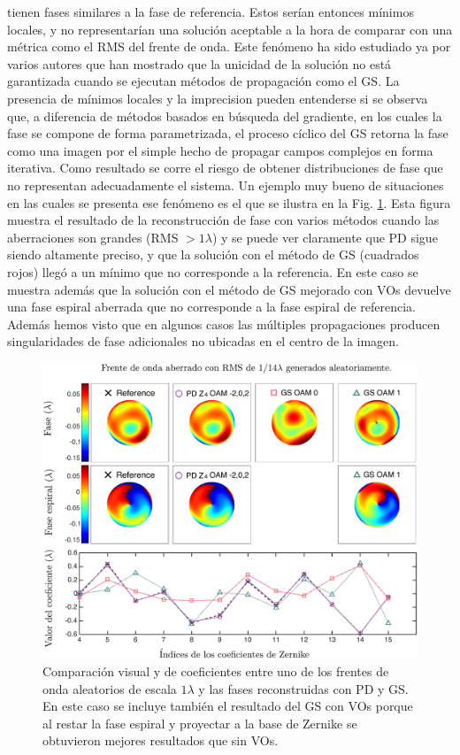 tienen fases similares a la fase de referencia.  Estos serían entonces
mínimos locales, y no representarían una solución aceptable a la hora
de comparar con una métrica como el RMS del frente de onda. Este
fenómeno ha sido estudiado ya por varios autores
 que han mostrado que la unicidad
de la solución no está garantizada cuando se ejecutan métodos de
propagación como el GS.  
La presencia de mínimos locales y la
imprecision pueden entenderse si se observa 
que, a diferencia de métodos basados en búsqueda del gradiente, en los
cuales la fase se compone de forma parametrizada, el proceso cíclico
del GS retorna la fase como una imagen por el simple hecho de propagar campos complejos
en forma iterativa. Como resultado se corre el riesgo de obtener distribuciones
de fase que no representan adecuadamente el sistema.  Un ejemplo muy bueno de situaciones en las
cuales se presenta ese fenómeno es el que se ilustra en la Fig.
\ref{fig:visual_comparison}. Esta figura muestra el resultado de la
reconstrucción de fase con varios métodos cuando las aberraciones son
grandes (RMS $>1\lambda$) y se puede ver claramente que PD sigue siendo
altamente preciso, y que la solución
con el método de GS (cuadrados rojos) llegó a un mínimo que no
corresponde a la referencia. En este caso se muestra además que la
solución con el método de GS mejorado con VOs devuelve una fase espiral
aberrada que no corresponde a la fase espiral de referencia. Además hemos
visto que en algunos casos las múltiples propagaciones
producen singularidades de fase adicionales no ubicadas en el centro
de la imagen. 
\begin{figure}[h!]
\centering
\includegraphics[scale=.3]{phase_comparison_esp_2.pdf}
\caption[Resultados visuales de simulaciones de PD coherente para
aberración $1\lambda$]{Comparación visual y de coeficientes entre uno de los frentes
  de onda aleatorios de escala $1\lambda$ y las fases reconstruidas
  con PD y GS. En este caso se incluye también el resultado del GS con
VOs porque al restar la fase espiral y proyectar a la base de Zernike
se obtuvieron mejores resultados que sin VOs.} 
\label{fig:visual_comparison}
\end{figure}
